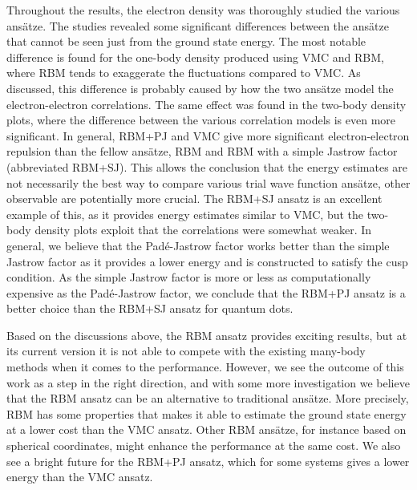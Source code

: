 Throughout the results, the electron density was thoroughly studied the various ansätze. The studies revealed some significant differences between the ansätze that cannot be seen just from the ground state energy. The most notable difference is found for the one-body density produced using VMC and RBM, where RBM tends to exaggerate the fluctuations compared to VMC. As discussed, this difference is probably caused by how the two ansätze model the electron-electron correlations. The same effect was found in the two-body density plots, where the difference between the various correlation models is even more significant. In general, RBM+PJ and VMC give more significant electron-electron repulsion than the fellow ansätze, RBM and RBM with a simple Jastrow factor (abbreviated RBM+SJ). This allows the conclusion that the energy estimates are not necessarily the best way to compare various trial wave function ansätze, other observable are potentially more crucial. The RBM+SJ ansatz is an excellent example of this, as it provides energy estimates similar to VMC, but the two-body density plots exploit that the correlations were somewhat weaker. In general, we believe that the Padé-Jastrow factor works better than the simple Jastrow factor as it provides a lower energy and is constructed to satisfy the cusp condition. As the simple Jastrow factor is more or less as computationally expensive as the Padé-Jastrow factor, we conclude that the RBM+PJ ansatz is a better choice than the RBM+SJ ansatz for quantum dots.

Based on the discussions above, the RBM ansatz provides exciting results, but at its current version it is not able to compete with the existing many-body methods when it comes to the performance. However, we see the outcome of this work as a step in the right direction, and with some more investigation we believe that the RBM ansatz can be an alternative to traditional ansätze. More precisely, RBM has some properties that makes it able to estimate the ground state energy at a lower cost than the VMC ansatz. Other RBM ansätze, for instance based on spherical coordinates, might enhance the performance at the same cost. We also see a bright future for the RBM+PJ ansatz, which for some systems gives a lower energy than the VMC ansatz.

